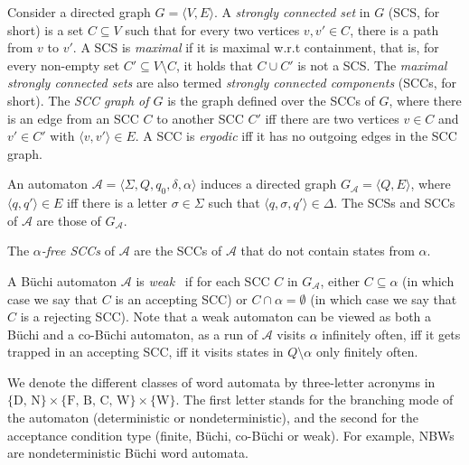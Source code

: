 \documentclass[10pt,a4paper]{amsart}
\theoremstyle{definition}
\numberwithin{equation}{section}
\newcommand{\buchi}{B\"uchi\xspace}
\newcommand{\A}{{\mathcal A}}
\begin{document}
Consider a directed graph $G = \langle V, E\rangle$. A \emph{strongly connected set\/} in $G$ (SCS, for short) is a set $C\subseteq V$ such that for every two vertices $v, v'\in C$, there is a path from $v$ to $v'$. A SCS is \emph{maximal} if it is maximal w.r.t containment, that is, for every non-empty set $C'\subseteq V\setminus C$, it holds that $C\cup C'$ is not a SCS. The \emph{maximal strongly connected sets} are also termed \emph{strongly connected components} (SCCs, for short). The \emph{SCC graph of $G$} is the graph defined over the SCCs of $G$, where there is an edge from an SCC $C$ to another SCC $C'$ iff there are two vertices $v\in C$ and $v'\in C'$ with $\langle v, v'\rangle\in E$. A SCC is \emph{ergodic} iff it has no outgoing edges in the SCC graph. 

An automaton $\A = \langle \Sigma, Q, q_0, \delta, \alpha\rangle$ induces a directed graph $G_{\A} = \langle Q, E \rangle$, where $\langle q, q'\rangle\in E$ iff there is a letter $\sigma \in \Sigma$ such that $\langle q, \sigma, q'\rangle \in \Delta$. The SCSs and SCCs of $\A$ are those of $G_{\A}$. 

The \emph{$\alpha$-free SCCs} of $\A$ are the SCCs of $\A$ that do not contain states from $\alpha$.



A B\"uchi automaton $\A$ is {\em weak}~\cite{MSS88} if for each SCC $C$ in $G_\A$, either $C\subseteq \alpha$ (in which case we say that $C$ is an accepting SCC) or $C \cap \alpha = \emptyset$ (in which case we say that $C$ is a rejecting SCC). Note that a weak automaton can be viewed as both a B\"uchi and a co-B\"uchi automaton, as a run of $\A$ visits $\alpha$ infinitely often, iff it gets trapped in an accepting SCC, iff
it visits states in $Q \setminus \alpha$ only finitely often.

We denote the different classes of word automata by three-letter acronyms in $\{ \text{D, N} \} \times \{ \text{F, B, C, W}\} \times \{\text{W}\}$. The first letter stands for the branching mode of the automaton (deterministic or nondeterministic), and  the second for the acceptance condition type (finite, \buchi, co-\buchi or weak). For example, NBWs are nondeterministic \buchi word automata. 
\end{document}
